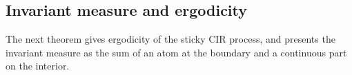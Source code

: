 \documentclass[aap,preprint]{imsart}
\numberwithin{equation}{section}
\theoremstyle{plain}
\theoremstyle{definition}
\newtheorem{definition}[theorem]{Definition}
\begin{document}
\subsection{Invariant measure and
ergodicity}\label{invariant-measure-and-ergodicity}

The next theorem gives ergodicity of the sticky CIR process, and presents the invariant measure as the sum of an atom at the boundary and a continuous part on the interior.  




\end{document}
